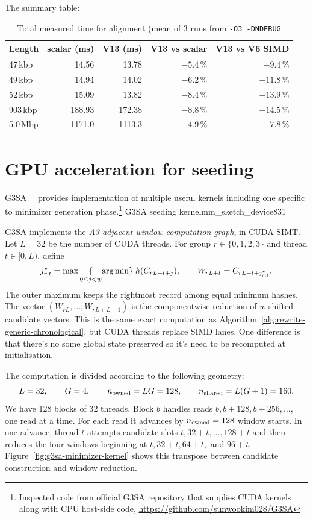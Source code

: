 The summary table:

\begin{table}[H]
  \centering
  \small
  \begin{tabular}{lrrrr}
    \toprule
    Length     & scalar (ms) & V13 (ms) & V13 vs scalar & V13 vs V6 SIMD \\
    \midrule
    47\,kbp   &  14.56  & 13.78 & $-5.4\,\%$ & $-9.4\,\%$ \\
    49\,kbp   &  14.94  & 14.02 & $-6.2\,\%$ & $-11.8\,\%$ \\
    52\,kbp   &  15.09  & 13.82 & $-8.4\,\%$ & $-13.9\,\%$ \\
    903\,kbp  & 188.93  & 172.38 & $-8.8\,\%$ & $-14.5\,\%$ \\
    5.0\,Mbp  & 1171.0  & 1113.3 & $-4.9\,\%$ & $-7.8\,\%$ \\
    \bottomrule
  \end{tabular}
  \caption{Total measured time for alignment
    (mean of 3 runs from
    \texttt{-O3 -DNDEBUG}}
  \label{tab:final-numbers}
\end{table}

\section{GPU acceleration for seeding}

G3SA~~\cite{g3sa_paper} provides implementation of multiple useful kernels including one specific to minimizer generation phase.\footnote{Inspected code from official G3SA repository that supplies CUDA kernels along with CPU host-side code,
\url{https://github.com/sunwookim028/G3SA}}%
  {G3SA seeding kernel}{mm_sketch_device}{83}{1}

G3SA implements the \emph{A3 adjacent-window computation graph}, in CUDA
SIMT. Let $L=32$ be the number of CUDA threads.  For group $r\in\{0,1,2,3\}$ and thread $t\in[0,L)$, define
\[
  j^\star_{r,t}
    = \max\underset{0\leq j<w}\{{\arg\min}\}\;
        h(C_{rL+t+j}),
  \qquad
  W_{rL+t}=C_{rL+t+j^\star_{r,t}} .
\]
The outer maximum keeps the rightmost record among equal minimum hashes.  The
vector $(W_{rL},\ldots,W_{rL+L-1})$ is the componentwise reduction of $w$
shifted candidate vectors.  This is the same exact computation as
Algorithm~\ref{alg:rewrite-generic-chronological}, but CUDA threads replace SIMD
lanes. One difference is that there's no some global state preserved so it's need to be recomputed at initialisation.

The computation is divided according to the following geometry:
\[
  L=32,\qquad G=4,\qquad
  n_{\rm owned}=LG=128,\qquad n_{\rm shared}=L(G+1)=160.
\]
We have 128 blocks of 32 threads.  Block $b$ handles reads
$b,b+128,b+256,\ldots$, one read at a time.  For each read it advances by
$n_{\rm owned}=128$ window starts.  In one advance, thread $t$ attempts
candidate slots $t,32+t,\ldots,128+t$ and then reduces the four windows
beginning at
$t,32+t,64+t,$ and $96+t$.  Figure~\ref{fig:g3sa-minimizer-kernel} shows this
transpose between candidate construction and window reduction.

